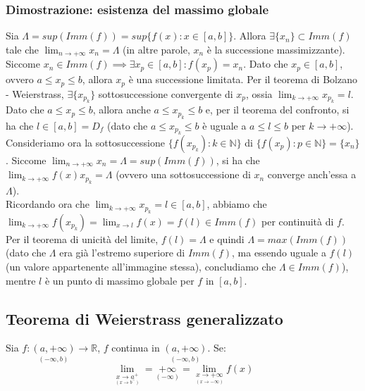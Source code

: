 \documentclass{article}
\begin{document}
\subsubsection{Dimostrazione: esistenza del massimo globale}
Sia $\Lambda = sup(Imm(f)) = sup\{f(x) : x \in [a, b]\}$. Allora $\exists \{x_n\} \subset Imm(f)$ tale che $\lim_{n \to +\infty} x_n = \Lambda$ (in altre parole, $x_n$ è la successione massimizzante).\\
Siccome $x_n \in Imm(f) \implies \exists x_p \in [a, b] : f(x_p) = x_n$. Dato che $x_p \in [a, b]$, ovvero $a \leq x_p \leq b$, allora $x_p$ è una successione limitata. Per il teorema di Bolzano - Weierstrass, $\exists \{x_{p_k}\}$ sottosuccessione convergente di $x_{p}$, ossia $\lim_{k \to +\infty} x_{p_k} = l$.\\
Dato che $a \leq x_p \leq b$, allora anche $a \leq x_{p_k} \leq b$ e, per il teorema del confronto, si ha che $l \in [a, b] = D_f$ (dato che $a \leq x_{p_k} \leq b$ è uguale a $a \leq l \leq b$ per $k \to +\infty$).\\
Consideriamo ora la sottosuccessione $\{f(x_{p_k}) : k \in \mathbb{N}\}$ di $\{f(x_{p}) : p \in \mathbb{N}\} = \{x_n\}$. Siccome $\lim_{n \to +\infty} x_n = \Lambda = sup(Imm(f))$, si ha che $\lim_{k \to +\infty} f(x) x_{p_k} = \Lambda$ (ovvero una sottosuccessione di $x_n$ converge anch'essa a $\Lambda$).\\
Ricordando ora che $\lim_{k \to +\infty} x_{p_k} = l \in [a, b]$, abbiamo che $\lim_{k \to +\infty} f(x_{p_k}) = \lim_{x \to l} f(x) = f(l) \in Imm(f)$ per continuità di $f$.\\
Per il teorema di unicità del limite, $f(l) = \Lambda$ e quindi $\Lambda = max(Imm(f))$ (dato che $\Lambda$ era già l'estremo superiore di $Imm(f)$, ma essendo uguale a $f(l)$ (un valore appartenente all'immagine stessa), concludiamo che $\Lambda \in Imm(f)$), mentre $l$ è un punto di massimo globale per $f$ in $[a, b]$.

\subsection{Teorema di Weierstrass generalizzato}
Sia $f: \underset{(-\infty, b)}{(a, +\infty)} \xrightarrow{} \mathbb{R}$, $f$ continua in $\underset{(-\infty, b)}{(a, +\infty)}$. Se:
\begin{equation*}
    \lim_{\underset{\scriptstyle (x \to b^-)}{x \to a^+}} = \underset{(-\infty)}{+\infty} = \lim_{\underset{\scriptstyle (x \to -\infty)}{x \to +\infty}} f(x)
\end{equation*}
\end{document}
